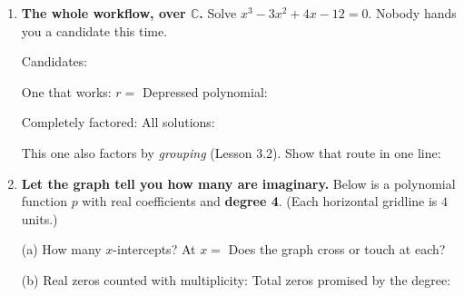 \documentclass[10pt]{article}
\newcommand{\lgrid}[4]{%
  \draw[step=1, linegray!40, very thin] (#1,#3) grid (#2,#4);
  \draw[->, semithick, charcoal] (#1,0)--(#2,0) node[below right, font=\scriptsize]{$x$};
  \draw[->, semithick, charcoal] (0,#3)--(0,#4) node[left, font=\scriptsize]{$y$};}
\begin{document}
\begin{tcolorbox}[colback=white, colframe=black!40, title=\textbf{Tier A --- Approaching Proficiency},
    fonttitle=\bfseries, arc=1.5mm, left=3mm, right=3mm, top=2mm, bottom=2mm, breakable]
\begin{enumerate}[leftmargin=1.7em, itemsep=10pt]
  \item \textbf{The whole workflow, over $\mathbb{C}$.} Solve $x^3 - 3x^2 + 4x - 12 = 0$. Nobody hands
    you a candidate this time.

    \vspace{2pt}
    Candidates: \blank{6.0cm}

    \vspace{2pt}
    One that works: $r = $ \blank{1.0cm} \quad Depressed polynomial: \blank{2.6cm}

    \vspace{2pt}
    Completely factored: \blank{4.6cm} \quad All solutions: \blank{3.6cm}

    \vspace{2pt}
    This one also factors by \emph{grouping} (Lesson 3.2). Show that route in one line:
    \blank{5.4cm}

  \item \textbf{Let the graph tell you how many are imaginary.} Below is a polynomial function $p$ with
    real coefficients and \textbf{degree 4}. (Each horizontal gridline is $4$ units.)
    \begin{center}
    \end{center}

    \vspace{2pt}
    (a) How many $x$-intercepts? \blank{1.0cm} \; At $x = $ \blank{2.0cm} \; Does the graph cross or
    touch at each? \blank{2.4cm}

    \vspace{2pt}
    (b) Real zeros counted with multiplicity: \blank{1.2cm} \quad Total zeros promised by the degree:
    \blank{1.2cm}


\end{enumerate}
\end{tcolorbox}
\end{document}
